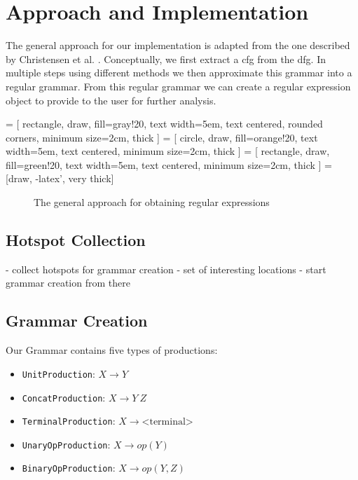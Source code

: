 \chapter{Approach and Implementation}
\label{chapter:Approach}

The general approach for our implementation is adapted from the one described by Christensen et al. \cite{brics}. Conceptually, we first extract a \ac{cfg} from the \ac{dfg}. In multiple steps using different methods we then approximate this grammar into a regular grammar. From this regular grammar we can create a regular expression object to provide to the user for further analysis.

 = [
	rectangle, 
	draw, 
	fill=gray!20, 
	text width=5em, 
	text centered, 
	rounded corners, 
	minimum size=2cm,
	thick
	]
 = [
	circle, 
	draw, 
	fill=orange!20, 
	text width=5em, 
	text centered,
	minimum size=2cm,
	thick
	]
 = [
	rectangle, 
	draw, 
	fill=green!20, 
	text width=5em, 
	text centered, 
	minimum size=2cm,
	thick
	]
 = [draw, -latex', very thick]
\begin{figure}[H]
	\centering
{}
\caption{The general approach for obtaining regular expressions}
\end{figure}
\label{fig:approach}

\section{Hotspot Collection}
- collect hotspots for grammar creation
- set of interesting locations
- start grammar creation from there

\section{Grammar Creation}
Our Grammar contains five types of productions:
\begin{itemize}
	\item \lstinline|UnitProduction|:  $X \rightarrow Y$
	\item \lstinline|ConcatProduction|: $X \rightarrow Y\ Z$
	\item \lstinline|TerminalProduction|: $X \rightarrow \text{<terminal>}$
	\item \lstinline|UnaryOpProduction|: $X \rightarrow op(Y)$
	\item \lstinline|BinaryOpProduction|: $X \rightarrow op(Y, Z)$
\end{itemize}

